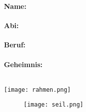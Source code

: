 \begin{minipage}[t][0.28\textheight][t]{\linewidth}
	\begin{minipage}[c]{0.6\textwidth}
		\textbf{Name:}\\ \profname\\
		\textbf{Abi:}\\ \profabi\\
		\textbf{Beruf:}\\ \profprof\\
		\textbf{Geheimnis:}\\ \profsecret\\
	\end{minipage}\hfill

	\begin{minipage}[c]{2.5cm}
		\texttt{[image: rahmen.png]}
	\end{minipage}
\end{minipage}

\begin{figure}[H]
	\hspace*{-1.5cm}\texttt{[image: seil.png]}
\end{figure}
